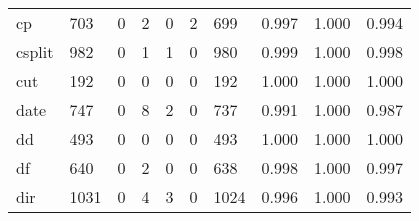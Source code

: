 \begin{longtable}{lp{1.3cm}p{1.3cm}p{1.3cm}p{1.3cm}p{1.3cm}p{1.3cm}p{1.3cm}p{1.3cm}p{1.3cm}}
cp        &                    703 &                                  0 &                                 2 &                                0 &                                 2 &                             699 &                                   0.997 &                                  1.000 &                                0.994 \\
csplit    &                    982 &                                  0 &                                 1 &                                1 &                                 0 &                             980 &                                   0.999 &                                  1.000 &                                0.998 \\
cut       &                    192 &                                  0 &                                 0 &                                0 &                                 0 &                             192 &                                   1.000 &                                  1.000 &                                1.000 \\
date      &                    747 &                                  0 &                                 8 &                                2 &                                 0 &                             737 &                                   0.991 &                                  1.000 &                                0.987 \\
dd        &                    493 &                                  0 &                                 0 &                                0 &                                 0 &                             493 &                                   1.000 &                                  1.000 &                                1.000 \\
df        &                    640 &                                  0 &                                 2 &                                0 &                                 0 &                             638 &                                   0.998 &                                  1.000 &                                0.997 \\
dir       &                   1031 &                                  0 &                                 4 &                                3 &                                 0 &                            1024 &                                   0.996 &                                  1.000 &                                0.993 \\

\end{longtable}
